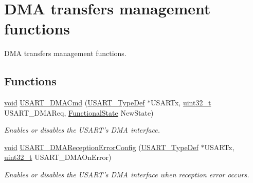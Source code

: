 \hypertarget{group___u_s_a_r_t___group11}{\section{D\-M\-A transfers management functions}
\label{group___u_s_a_r_t___group11}
}


D\-M\-A transfers management functions.  


\subsection*{Functions}
\begin{DoxyCompactItemize}
\item 
\hyperlink{group___n_a_m_e_ga18028b8badbf1ea7e704ccac3c488e82}{void} \hyperlink{group___u_s_a_r_t___group11_ga3ed90258a8b499aad8e89d31be52f195}{U\-S\-A\-R\-T\-\_\-\-D\-M\-A\-Cmd} (\hyperlink{struct_u_s_a_r_t___type_def}{U\-S\-A\-R\-T\-\_\-\-Type\-Def} $\ast$U\-S\-A\-R\-Tx, \hyperlink{stdint_8h_a435d1572bf3f880d55459d9805097f62}{uint32\-\_\-t} U\-S\-A\-R\-T\-\_\-\-D\-M\-A\-Req, \hyperlink{group___exported__types_gac9a7e9a35d2513ec15c3b537aaa4fba1}{Functional\-State} New\-State)
\begin{DoxyCompactList}\small\item\em Enables or disables the U\-S\-A\-R\-T's D\-M\-A interface. \end{DoxyCompactList}\item 
\hyperlink{group___n_a_m_e_ga18028b8badbf1ea7e704ccac3c488e82}{void} \hyperlink{group___u_s_a_r_t___group11_ga0cde9d183aabb1da00726e8798ec3e4d}{U\-S\-A\-R\-T\-\_\-\-D\-M\-A\-Reception\-Error\-Config} (\hyperlink{struct_u_s_a_r_t___type_def}{U\-S\-A\-R\-T\-\_\-\-Type\-Def} $\ast$U\-S\-A\-R\-Tx, \hyperlink{stdint_8h_a435d1572bf3f880d55459d9805097f62}{uint32\-\_\-t} U\-S\-A\-R\-T\-\_\-\-D\-M\-A\-On\-Error)
\begin{DoxyCompactList}\small\item\em Enables or disables the U\-S\-A\-R\-T's D\-M\-A interface when reception error occurs. \end{DoxyCompactList}\end{DoxyCompactItemize}


